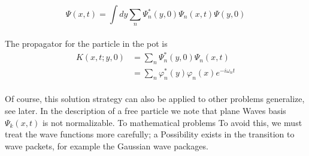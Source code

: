 \begin{equation}
\Psi(x, t)=\int d y \sum_{n} \Psi_{n}^{*}(y, 0) \Psi_{n}(x, t) \Psi(y, 0)
\end{equation}\\
The propagator for the particle in the pot is
\\
\begin{equation}
\begin{aligned} K(x, t ; y, 0) &=\sum_{n} \Psi_{n}^{*}(y, 0) \Psi_{n}(x, t) \\ &=\sum_{n} \varphi_{n}^{*}(y) \varphi_{n}(x) e^{-i \omega_{n} t} \end{aligned}
\end{equation}\\
Of course, this solution strategy can also be applied to other problems
generalize, see later.
In the description of a free particle we note that plane
Waves basis $\Psi_k(x,t)$ is not normalizable. To mathematical problems
To avoid this, we must treat the wave functions more carefully; a
Possibility exists in the transition to wave packets, for example the
Gaussian wave packages.


